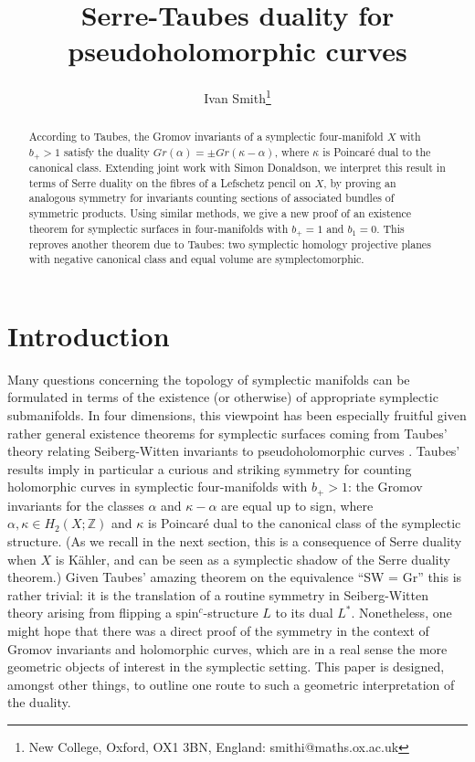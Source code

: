 \documentclass[10pt]{article}
\title{Serre-Taubes duality for pseudoholomorphic curves}
\author{Ivan Smith\thanks{New College, Oxford, OX1 3BN, England:
    smithi@maths.ox.ac.uk}}
\date{}
\newcommand{\zz}{\mathbb{Z}}
\begin{document}
\maketitle
\thispagestyle{empty}

\begin{abstract}
\noindent  According to Taubes, the Gromov invariants of a symplectic
four-manifold $X$ with $b_+ > 1$ satisfy the duality $Gr(\alpha) = \pm
Gr(\kappa - \alpha)$, where $\kappa$ is Poincar\'e dual to the
canonical class.  Extending joint work with Simon Donaldson, we
interpret this result in terms of Serre
duality on the fibres of a Lefschetz pencil on $X$, by proving an
analogous symmetry for invariants counting sections of
associated bundles of symmetric products.  Using similar methods, 
we give a new proof of an existence theorem for symplectic surfaces in
four-manifolds with $b_+ =1$ and $b_1=0$.  This reproves another theorem
due to Taubes: two symplectic homology projective planes with negative
canonical class and equal volume are symplectomorphic. 
\end{abstract}

\section{Introduction}

Many questions concerning the topology of symplectic manifolds can be
formulated in terms of the existence (or otherwise) of appropriate
symplectic submanifolds.  In four dimensions, this viewpoint has been
especially fruitful given rather general existence theorems for
symplectic surfaces coming from Taubes' theory relating Seiberg-Witten
invariants to pseudoholomorphic curves \cite{Taubes}.  Taubes' results
imply in particular a curious and striking symmetry for counting
holomorphic curves in symplectic four-manifolds with $b_+ > 1$:  the Gromov
invariants for the classes $\alpha$ and $\kappa-\alpha$ are equal up
to sign, where
$\alpha, \kappa \in H_2 (X; \zz)$ and $\kappa$ is Poincar\'e dual to the
canonical class of the symplectic structure.  (As we recall in the next
section, this is a consequence of Serre duality when $X$ is K\"ahler,
and can be seen as a symplectic shadow of the Serre duality theorem.)
Given Taubes' amazing
theorem on the equivalence ``SW = Gr'' this is rather trivial: it is
the translation of a routine symmetry in Seiberg-Witten theory arising
from flipping a spin$^c$-structure $L$ to its dual $L^*$.
Nonetheless, one might hope that there was a direct proof of the
symmetry in the context of Gromov invariants and holomorphic curves,
which are in a real sense the more geometric objects of interest in
the symplectic setting.  This paper is designed, amongst other things,
to outline one route to such a geometric interpretation of the duality.
\end{document}
